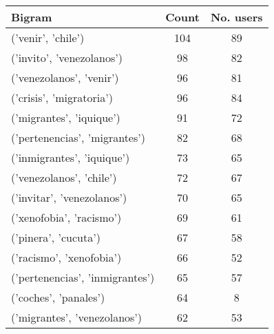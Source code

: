 %
    
    \begin{tabular}{lcc}
        \toprule\toprule
        Bigram & Count & No. users\\ \midrule
        ('venir', 'chile') & 104 & 89 \\ 
        ('invito', 'venezolanos') &  98 &82 \\ 
        ('venezolanos', 'venir') &  96 & 81 \\ 
        ('crisis', 'migratoria') &  96 & 84 \\
        ('migrantes', 'iquique') & 91 & 72 \\ 
        ('pertenencias', 'migrantes') & 82 & 68 \\ 
        ('inmigrantes', 'iquique') & 73 & 65 \\ 
        ('venezolanos', 'chile') & 72 & 67 \\
        ('invitar', 'venezolanos') & 70 & 65 \\ 
        ('xenofobia', 'racismo') & 69 & 61 \\
        ('pinera', 'cucuta') & 67 & 58 \\ 
        ('racismo', 'xenofobia') & 66 & 52 \\ 
        ('pertenencias', 'inmigrantes') & 65 & 57 \\
        ('coches', 'panales') & 64 & 8 \\
        ('migrantes', 'venezolanos') & 62 & 53 \\
        \bottomrule\bottomrule
    \end{tabular}

%